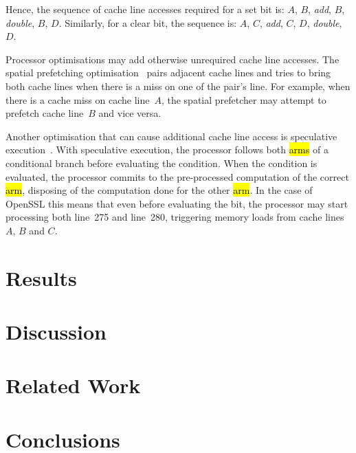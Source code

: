 \documentclass{llncs}
\begin{document}
Hence, the sequence of cache line accesses required for a set bit is: $A$, $B$, \textit{add}, $B$, \textit{double}, $B$, $D$.
Similarly, for a clear bit, the sequence is: $A$, $C$, \textit{add}, $C$, $D$, \textit{double}, $D$.

Processor optimisations may add otherwise unrequired cache line accesses.
The spatial prefetching optimisation~\cite{intel12optimization} pairs adjacent cache lines and tries to bring both cache lines
when there is a miss on one of the pair's line.
For example, when there is a cache miss on cache line~$A$, the spatial prefetcher may attempt to prefetch cache line~$B$
and vice versa.

Another optimisation that can cause additional cache line access is speculative execution~\cite{uht95disjoint}.
With speculative execution, the processor follows both \hl{arms} of a conditional branch before evaluating
the condition.
When the condition is evaluated, the processor commits to the pre-processed computation of the correct \hl{arm},
disposing of the computation done for the other \hl{arm}. 
In the case of OpenSSL this means that even before evaluating the bit, 
the processor may start processing both line~275 and line~280, triggering memory loads from cache lines~$A$, $B$ and $C$.




\section{Results}
\section{Discussion}
\section{Related Work}
\section{Conclusions}



\end{document}
